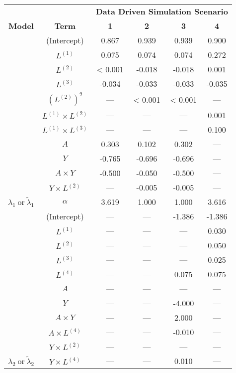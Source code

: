 \begin{table}
\begin{minipage}[t]{0.5\textwidth}
\begin{tabular}[t]{|>{}c|c|c|c|c|>{}c|}
\hline
\multicolumn{1}{|c|}{\textbf{ }} & \multicolumn{1}{|c|}{\textbf{ }} & \multicolumn{4}{|c|}{\textbf{Data Driven Simulation Scenario}} \\
\cline{3-6}
\textbf{Model} & \textbf{Term} & \textbf{1} & \textbf{2} & \textbf{3} & \textbf{4}\\
\hline
 & (Intercept) & 0.867 & 0.939 & 0.939 & 0.900\\
\cline{2-6}
 & $L^{(1)}$ & 0.075 & 0.074 & 0.074 & 0.272\\
\cline{2-6}
 & $L^{(2)}$ & < 0.001 & -0.018 & -0.018 & 0.001\\
\cline{2-6}
 & $L^{(3)}$ & -0.034 & -0.033 & -0.033 & -0.035\\
\cline{2-6}
 & $(L^{(2)})^2$ & --- & < 0.001 & < 0.001 & ---\\
\cline{2-6}
 & $L^{(1)} \times L^{(2)}$ & --- & --- & --- & 0.001\\
\cline{2-6}
 & $L^{(1)} \times L^{(3)}$ & --- & --- & --- & 0.100\\
\cline{2-6}
 & $A$ & 0.303 & 0.102 & 0.302 & ---\\
\cline{2-6}
 & $Y$ & -0.765 & -0.696 & -0.696 & ---\\
\cline{2-6}
 & $A\times Y$ & -0.500 & -0.050 & -0.500 & ---\\
\cline{2-6}
 & $Y \times L^{(2)}$ & --- & -0.005 & -0.005 & ---\\
\cline{2-6}
\multirow{-12}{*}{\centering\arraybackslash $\lambda_1~\text{or}~\tilde\lambda_1$} & $\alpha$ & 3.619 & 1.000 & 1.000 & 3.616\\
\cline{1-6}
 & (Intercept) & --- & --- & -1.386 & -1.386\\
\cline{2-6}
 & $L^{(1)}$ & --- & --- & --- & 0.030\\
\cline{2-6}
 & $L^{(2)}$ & --- & --- & --- & 0.050\\
\cline{2-6}
 & $L^{(3)}$ & --- & --- & --- & 0.025\\
\cline{2-6}
 & $L^{(4)}$ & --- & --- & 0.075 & 0.075\\
\cline{2-6}
 & $A$ & --- & --- & --- & ---\\
\cline{2-6}
 & $Y$ & --- & --- & -4.000 & ---\\
\cline{2-6}
 & $A\times Y$ & --- & --- & 2.000 & ---\\
\cline{2-6}
 & $A \times L^{(4)}$ & --- & --- & -0.010 & ---\\
\cline{2-6}
 & $Y \times L^{(2)}$ & --- & --- & --- & ---\\
\cline{2-6}
\multirow{-11}{*}{\centering\arraybackslash $\lambda_2~\text{or}~\tilde\lambda_2$} & $Y \times L^{(4)}$ & --- & --- & 0.010 & ---\\
\hline
\end{tabular}
\end{minipage}
\end{table}
